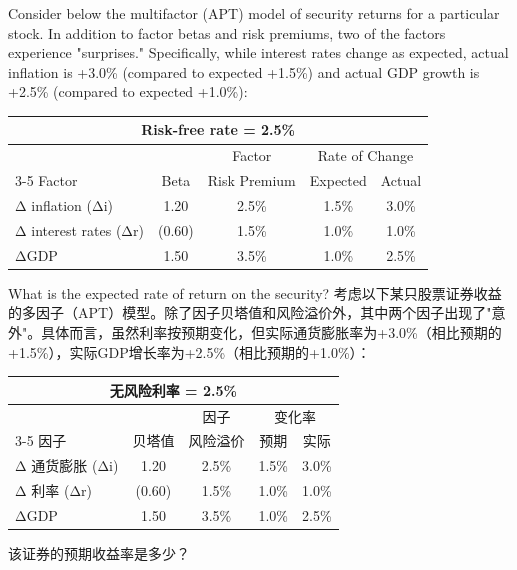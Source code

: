 \documentclass{article}
\newcounter{question} %
\begin{document}
\begin{question}
    Consider below the multifactor (APT) model of security returns for a particular stock. In addition to factor betas and risk premiums, two of the factors experience "surprises." Specifically, while interest rates change as expected, actual inflation is +3.0\% (compared to expected +1.5\%) and actual GDP growth is +2.5\% (compared to expected +1.0\%):

    \begin{table}[H]
        \centering
        \begin{tabular}{|l|c|c|c|c|}
            \hline
            \multicolumn{5}{|c|}{Risk-free rate = 2.5\%} \\
            \hline
            & & Factor & \multicolumn{2}{c|}{Rate of Change} \\
            \cline{3-5}
            Factor & Beta & Risk Premium & Expected & Actual \\
            \hline
            Δ inflation (Δi) & 1.20 & 2.5\% & 1.5\% & 3.0\% \\
            Δ interest rates (Δr) & (0.60) & 1.5\% & 1.0\% & 1.0\% \\
            ΔGDP & 1.50 & 3.5\% & 1.0\% & 2.5\% \\
            \hline
        \end{tabular}
    \end{table}

    What is the expected rate of return on the security?
    考虑以下某只股票证券收益的多因子（APT）模型。除了因子贝塔值和风险溢价外，其中两个因子出现了"意外"。具体而言，虽然利率按预期变化，但实际通货膨胀率为+3.0\%（相比预期的+1.5\%），实际GDP增长率为+2.5\%（相比预期的+1.0\%）：

    \begin{table}[H]
        \centering
        \begin{tabular}{|l|c|c|c|c|}
            \hline
            \multicolumn{5}{|c|}{无风险利率 = 2.5\%} \\
            \hline
            & & 因子 & \multicolumn{2}{c|}{变化率} \\
            \cline{3-5}
            因子 & 贝塔值 & 风险溢价 & 预期 & 实际 \\
            \hline
            Δ 通货膨胀 (Δi) & 1.20 & 2.5\% & 1.5\% & 3.0\% \\
            Δ 利率 (Δr) & (0.60) & 1.5\% & 1.0\% & 1.0\% \\
            ΔGDP & 1.50 & 3.5\% & 1.0\% & 2.5\% \\
            \hline
        \end{tabular}
    \end{table}

    该证券的预期收益率是多少？
\end{question}
\end{document}
